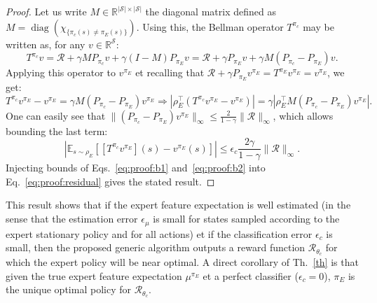 \documentclass[english,utf8]{./hermes-journal}
\newcommand{\diag}{\operatorname*{diag}}
\newcommand{\R}{\mathcal{R}}
\newcommand{\s}{\mathcal{S}}
\newcommand{\E}{\mathbb{E}}
\begin{document}
\begin{proof}
  Let us write $M\in\mathbb{R}^{|\s|\times |\s|}$ the diagonal matrix
  defined as $M = \diag (\chi_{\{\pi_c(s)\neq\pi_E(s)\}})$. Using
  this, the Bellman operator $T^{\pi_c}$ may be written as, for any $v\in\mathbb{R}^\s$:
  \begin{equation}
    T^{\pi_c}v = \R + \gamma M P_{\pi_c} v + \gamma (I-M)P_{\pi_E} v
    = \R + \gamma P_{\pi_E} v + \gamma M (P_{\pi_c}-P_{\pi_E})v.
  \end{equation}
  Applying this operator to $v^{\pi_E}$ et recalling that $\R +
  \gamma P_{\pi_E} v^{\pi_E} = T^{\pi_E} v^{\pi_E} = v^{\pi_E}$, we
  get:
  \begin{equation}
    T^{\pi_c}v^{\pi_E} - v^{\pi_E} = \gamma M
    (P_{\pi_c}-P_{\pi_E})v^{\pi_E}
    \Rightarrow |\rho_E^\top (T^{\pi_c}v^{\pi_E} - v^{\pi_E})| = \gamma
    |\rho_E^\top M (P_{\pi_c}-P_{\pi_E})v^{\pi_E}|.
  \end{equation}
  One can easily see that $\|(P_{\pi_c}-P_{\pi_E})v^{\pi_E}\|_\infty
  \leq \frac{2}{1-\gamma}\|\R\|_\infty$, which allows bounding the
  last term:
  \begin{equation}
    |\E_{s\sim\rho_E}[[T^{\pi_c}v^{\pi_E}](s) - v^{\pi_E}(s)]| \leq
    \epsilon_c \frac{2\gamma}{1-\gamma} \|\R\|_\infty.
    \label{eq:proof:b2}
  \end{equation}
  Injecting bounds of Eqs.~\eqref{eq:proof:b1}
  and~\eqref{eq:proof:b2} into Eq.~\eqref{eq:proof:residual} gives the
  stated result.%
\end{proof}

This result shows that if the expert feature expectation is well
estimated (in the sense that the estimation error $\epsilon_\mu$ is
small for states sampled according to the expert stationary policy
and for all actions) et if the classification error $\epsilon_c$ is
small, then the proposed generic algorithm outputs a reward function
$\R_{\theta_c}$ for which the expert policy will be near optimal. A
direct corollary of Th.~\ref{th} is that given the true expert
feature expectation $\mu^{\pi_E}$ et a perfect classifier
($\epsilon_c=0$), $\pi_E$ is the unique optimal policy for
$\R_{\theta_c}$.
\end{document}

